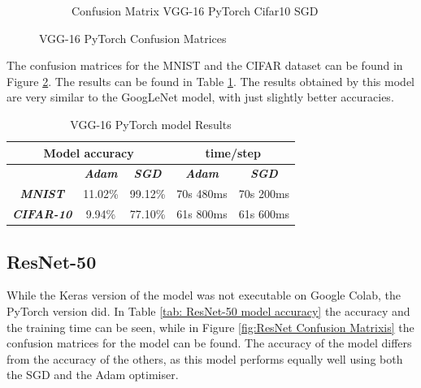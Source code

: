 \documentclass[conference]{IEEEtran}
\begin{document}
\begin{figure}[!htbp]
\begin{subfigure}[b]{0.22\textwidth}
        \caption{Confusion Matrix VGG-16 PyTorch Cifar10 SGD}
        \label{fig:x matrix_VGG-16_PyTorch_CIFAR_SGD}
    \end{subfigure}
    \caption{VGG-16 PyTorch Confusion Matrices}
    \label{fig:VGG-16 PyTorch Confusion Matrixis}
\end{figure}

The confusion matrices for the MNIST and the CIFAR dataset can be found in Figure \ref{fig:VGG-16 PyTorch Confusion Matrixis}.
The results can be found in Table \ref{tab: VGG-16 PyTorch model accuracy}.
The results obtained by this model are very similar to the GoogLeNet model, with just slightly better accuracies.

\begin{table}[!htbp]
    \caption{VGG-16 PyTorch model Results}
    \begin{center}
    \begin{tabular}{|c|c|c|c|c|}
    \cline{1-5} 
    \multicolumn{3}{|c|}{\textbf{Model accuracy}} & \multicolumn{2}{|c|}{\textbf{time/step}} \\
    \hline 
    \textit{} & \textbf{\textit{Adam}} & \textbf{\textit{SGD}} & \textbf{\textit{Adam}} & \textbf{\textit{SGD}} \\
    \hline
    \textbf{\textit{MNIST}} & 11.02\% & 99.12\% & 70s 480ms & 70s 200ms  \\
    \hline
    \textbf{\textit{CIFAR-10}} & 9.94\% & 77.10\% & 61s 800ms & 61s 600ms \\
    \cline{1-5} 
    \end{tabular}
    \label{tab: VGG-16 PyTorch model accuracy}
    \end{center}
\end{table}

\subsection{ResNet-50}
While the Keras version of the model was not executable on Google Colab, the PyTorch version did.
In Table \ref{tab: ResNet-50 model accuracy} the accuracy and the training time can be seen, while in Figure \ref{fig:ResNet Confusion Matrixis} the confusion matrices for the model can be found.
The accuracy of the model differs from the accuracy of the others, as this model performs equally well using both the SGD and the Adam optimiser.
\end{document}
